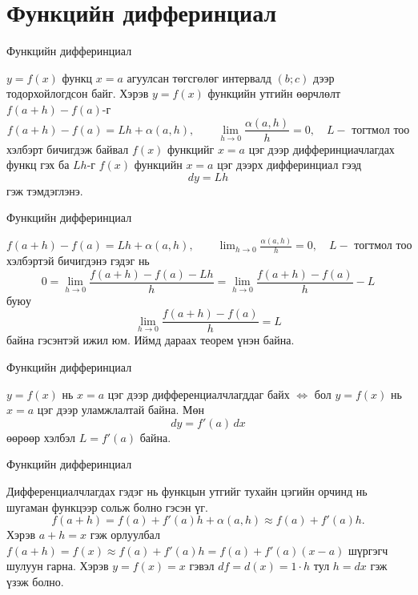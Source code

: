 

\section{Функцийн дифферинциал}
\begin{frame}[allowframebreaks]{Функцийн дифферинциал}
\begin{definition}
$y=f(x)$ функц $x=a$ агуулсан төгсгөлөг интервалд $(b;c)$ дээр тодорхойлогдсон байг. Хэрэв $y=f(x)$ функцийн утгийн өөрчлөлт $f(a+h)-f(a)$-г $$f(a+h)-f(a)=Lh+\alpha(a,h), \qquad \lim_{h\to0}\frac{\alpha(a,h)}{h}=0 ,\quad L-\text{ тогтмол тоо}$$ хэлбэрт бичигдэж байвал $f(x)$ функцийг $x=a$ цэг дээр дифферинциачлагдах функц гэх ба $Lh$-г $f(x)$ функцийн $x=a$ цэг дээрх дифферинциал гээд $$dy=Lh$$ гэж тэмдэглэнэ.
\end{definition}
\end{frame}

\begin{frame}[allowframebreaks]{Функцийн дифферинциал}
\begin{remark}
   $f(a+h)-f(a)=Lh+\alpha(a,h), \qquad \lim_{h\to0}\frac{\alpha(a,h)}{h}=0 ,\quad L-\text{ тогтмол тоо}$ хэлбэртэй бичигдэнэ гэдэг нь  
\[
0=\lim_{h\to0}\frac{f(a+h)-f(a)-Lh}{h}=\lim_{h\to0}\frac{f(a+h)-f(a)}{h}-L
\] буюу $$\lim_{h\to0}\frac{f(a+h)-f(a)}{h}=L$$ байна гэсэнтэй ижил юм. Иймд дараах теорем үнэн байна.
\end{remark}
\end{frame}

\begin{frame}[allowframebreaks]{Функцийн дифферинциал}
\begin{theorem} \(y=f(x)\) нь \(x=a\) цэг дээр дифференциалчлагддаг байх $\Leftrightarrow$ бол \(y=f(x)\) нь \(x=a\) цэг дээр уламжлалтай байна. Мөн \[
dy = f'(a)\,dx
\]
  өөрөөр хэлбэл $L=f'(a)$ байна. 
\end{theorem}
\end{frame}

\begin{frame}[allowframebreaks]{Функцийн дифферинциал}
\begin{remark}
  Дифференциалчлагдах гэдэг нь функцын утгийг тухайн цэгийн орчинд нь шугаман функцээр сольж болно гэсэн үг.
\[
f(a+h)=f(a)+f'(a)h+\alpha(a,h)\approx f(a)+f'(a)h.
\] Хэрэв $a+h=x$ гэж орлуулбал $f(a+h)=f(x)\approx f(a)+f'(a)h=f(a)+f'(a)(x-a)$
шүргэгч шулуун гарна. Хэрэв $y=f(x)=x$ гэвэл $df=d(x)=1\cdot h$ тул $h=dx$ гэж үзэж болно.
\end{remark}
\end{frame}

